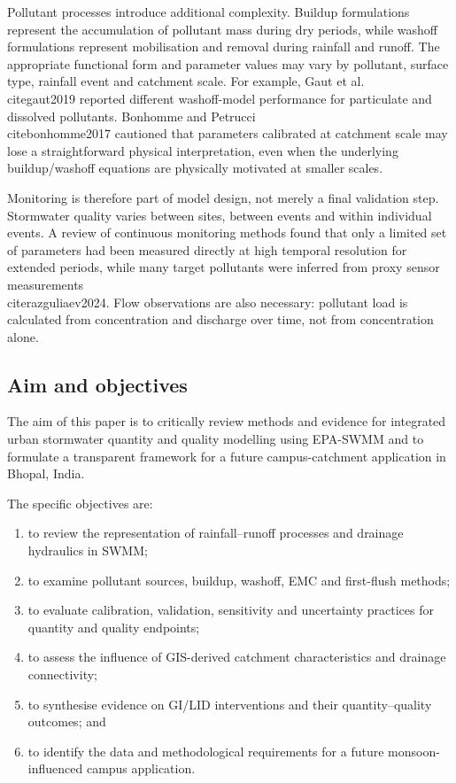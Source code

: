 \documentclass[journal]{IEEEtran}
\begin{document}
Pollutant processes introduce additional complexity. Buildup formulations represent the accumulation of pollutant mass during dry periods, while washoff formulations represent mobilisation and removal during rainfall and runoff. The appropriate functional form and parameter values may vary by pollutant, surface type, rainfall event and catchment scale. For example, Gaut et al. \\cite{gaut2019} reported different washoff-model performance for particulate and dissolved pollutants. Bonhomme and Petrucci \\cite{bonhomme2017} cautioned that parameters calibrated at catchment scale may lose a straightforward physical interpretation, even when the underlying buildup/washoff equations are physically motivated at smaller scales.

Monitoring is therefore part of model design, not merely a final validation step. Stormwater quality varies between sites, between events and within individual events. A review of continuous monitoring methods found that only a limited set of parameters had been measured directly at high temporal resolution for extended periods, while many target pollutants were inferred from proxy sensor measurements \\cite{razguliaev2024}. Flow observations are also necessary: pollutant load is calculated from concentration and discharge over time, not from concentration alone.

\subsection{Aim and objectives}
The aim of this paper is to critically review methods and evidence for integrated urban stormwater quantity and quality modelling using EPA-SWMM and to formulate a transparent framework for a future campus-catchment application in Bhopal, India.

The specific objectives are:
\begin{enumerate}[leftmargin=1.5em]
  \item to review the representation of rainfall--runoff processes and drainage hydraulics in SWMM;
  \item to examine pollutant sources, buildup, washoff, EMC and first-flush methods;
  \item to evaluate calibration, validation, sensitivity and uncertainty practices for quantity and quality endpoints;
  \item to assess the influence of GIS-derived catchment characteristics and drainage connectivity;
  \item to synthesise evidence on GI/LID interventions and their quantity--quality outcomes; and
  \item to identify the data and methodological requirements for a future monsoon-influenced campus application.
\end{enumerate}
\end{document}
